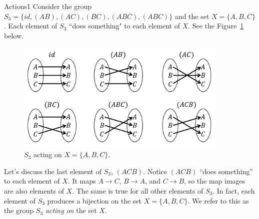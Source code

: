 \begin{example}{Actions1} Consider the group $S_3=\{id,(AB),(AC),(BC),(ABC),(ABC)\}$ and the set $X=\{A,B,C\}$. Each element of $S_3$ ``does something" to each element of $X$. See the Figure~\ref{fig:S3onABC} below.

\begin{figure}[htbp]
\begin{center}
\includegraphics[width=4in]{images/S3onABC.png}
\caption{$S_3$ acting on $X=\{A,B,C\}$.}\label{fig:S3onABC}
\end{center}
\end{figure}

Let's discuss the last element of $S_3$, $(ACB)$. Notice $(ACB)$ ``does something'' to each element of $X$. It maps $A\rightarrow C$, $B\rightarrow A$, and $C\rightarrow B$, so the map images are also elements of $X$. The same is true for all other elements of $S_3$. In fact, each element of $S_3$ produces a bijection on the set $X=\{A,B,C\}$. We refer to this as the group $S_3$ \emph{acting on} the set $X$.
\end{example} 

